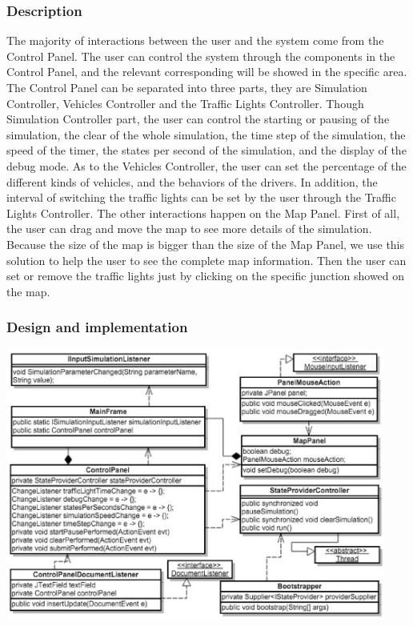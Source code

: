 \documentclass[a4paper,12pt]{article}
\begin{document}
\subsubsection{Description} The majority of interactions between the user and the system come from the Control Panel. The user can control the system through the components in the Control Panel, and the relevant corresponding will be showed in the specific area. The Control Panel can be separated into three parts, they are Simulation Controller, Vehicles Controller and the Traffic Lights Controller. Though Simulation Controller part, the user can control the starting or pausing of the simulation, the clear of the whole simulation, the time step of the simulation, the speed of the timer, the states per second of the simulation, and the display of the debug mode. As to the Vehicles Controller, the user can set the percentage of the different kinds of vehicles, and the behaviors of the drivers. In addition, the interval of switching the traffic lights can be set by the user through the Traffic Lights Controller.
The other interactions happen on the Map Panel. First of all, the user can drag and move the map to see more details of the simulation. Because the size of the map is bigger than the size of the Map Panel, we use this solution to help the user to see the complete map information. Then the user can set or remove the traffic lights just by clicking on the specific junction showed on the map.

\subsubsection{Design and implementation}
\includegraphics[width=12.5cm]{class.eps}
\end{document}
